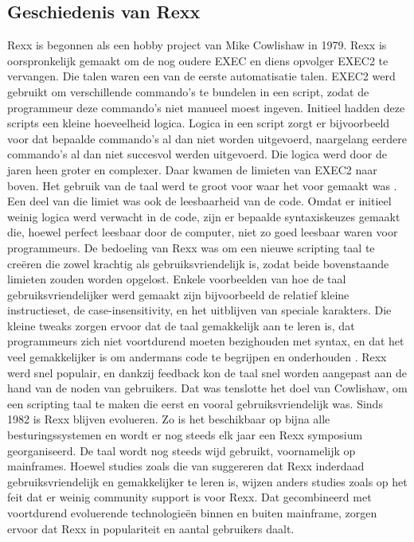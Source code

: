 \subsection{Geschiedenis van Rexx}
Rexx is begonnen als een hobby project van Mike Cowlishaw in 1979. Rexx is oorspronkelijk gemaakt om de nog oudere EXEC en diens opvolger EXEC2 te vervangen. Die talen waren een van de eerste automatisatie talen. EXEC2 werd gebruikt om verschillende commando’s te bundelen in een script, zodat de programmeur deze commando’s niet manueel moest ingeven. Initieel hadden deze scripts een kleine hoeveelheid logica. Logica in een script zorgt er bijvoorbeeld voor dat bepaalde commando’s al dan niet worden uitgevoerd, naargelang eerdere commando's al dan niet succesvol werden uitgevoerd. Die logica werd door de jaren heen groter en complexer. Daar kwamen de limieten van EXEC2 naar boven. Het gebruik van de taal werd te groot voor waar het voor gemaakt was \autocites{Cowlishaw1994}. Een deel van die limiet was ook de leesbaarheid van de code. Omdat er initieel weinig logica werd verwacht in de code, zijn er bepaalde syntaxiskeuzes gemaakt die, hoewel perfect leesbaar door de computer, niet zo goed leesbaar waren voor programmeurs. De bedoeling van Rexx was om een nieuwe scripting taal te creëren die zowel krachtig als gebruiksvriendelijk is, zodat beide bovenstaande limieten zouden worden opgelost. Enkele voorbeelden van hoe de taal gebruiksvriendelijker werd gemaakt zijn bijvoorbeeld de relatief kleine instructieset, de case-insensitivity, en het uitblijven van speciale karakters. Die kleine tweaks zorgen ervoor dat de taal gemakkelijk aan te leren is, dat programmeurs zich niet voortdurend moeten bezighouden met syntax, en dat het veel gemakkelijker is om andermans code te begrijpen en onderhouden \autocites{Cowlishaw1984}. Rexx werd snel populair, en dankzij feedback kon de taal snel worden aangepast aan de hand van de noden van gebruikers. Dat was tenslotte het doel van Cowlishaw, om een scripting taal te maken die eerst en vooral gebruiksvriendelijk was. Sinds 1982 is Rexx blijven evolueren. Zo is het beschikbaar op bijna alle besturingssystemen en wordt er nog steeds elk jaar een Rexx symposium georganiseerd. De taal wordt nog steeds wijd gebruikt, voornamelijk op mainframes. Hoewel studies zoals die van \textcites{Winkler2023} suggereren dat Rexx inderdaad gebruiksvriendelijk en gemakkelijker te leren is, wijzen anders studies zoals \textcites{OMPMWG2024} op het feit dat er weinig community support is voor Rexx. Dat gecombineerd met voortdurend evoluerende technologieën binnen en buiten mainframe, zorgen ervoor dat Rexx in populariteit en aantal gebruikers daalt.

